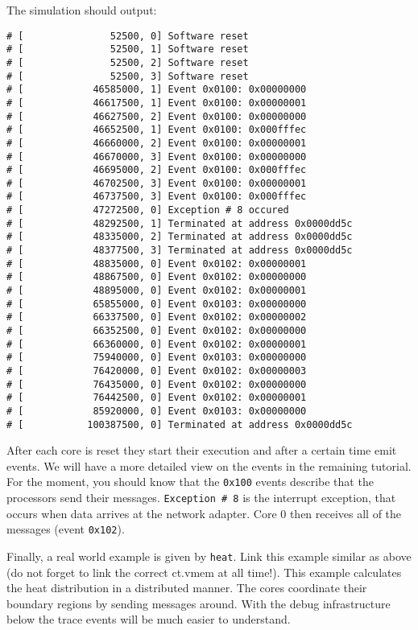 The simulation should output:

\begin{verbatim}
# [               52500, 0] Software reset
# [               52500, 1] Software reset
# [               52500, 2] Software reset
# [               52500, 3] Software reset
# [            46585000, 1] Event 0x0100: 0x00000000
# [            46617500, 1] Event 0x0100: 0x00000001
# [            46627500, 2] Event 0x0100: 0x00000000
# [            46652500, 1] Event 0x0100: 0x000fffec
# [            46660000, 2] Event 0x0100: 0x00000001
# [            46670000, 3] Event 0x0100: 0x00000000
# [            46695000, 2] Event 0x0100: 0x000fffec
# [            46702500, 3] Event 0x0100: 0x00000001
# [            46737500, 3] Event 0x0100: 0x000fffec
# [            47272500, 0] Exception # 8 occured
# [            48292500, 1] Terminated at address 0x0000dd5c
# [            48335000, 2] Terminated at address 0x0000dd5c
# [            48377500, 3] Terminated at address 0x0000dd5c
# [            48835000, 0] Event 0x0102: 0x00000001
# [            48867500, 0] Event 0x0102: 0x00000000
# [            48895000, 0] Event 0x0102: 0x00000001
# [            65855000, 0] Event 0x0103: 0x00000000
# [            66337500, 0] Event 0x0102: 0x00000002
# [            66352500, 0] Event 0x0102: 0x00000000
# [            66360000, 0] Event 0x0102: 0x00000001
# [            75940000, 0] Event 0x0103: 0x00000000
# [            76420000, 0] Event 0x0102: 0x00000003
# [            76435000, 0] Event 0x0102: 0x00000000
# [            76442500, 0] Event 0x0102: 0x00000001
# [            85920000, 0] Event 0x0103: 0x00000000
# [           100387500, 0] Terminated at address 0x0000dd5c
\end{verbatim}

After each core is reset they start their execution and after a
certain time emit events. We will have a more detailed view on the
events in the remaining tutorial. For the moment, you should know that
the \verb|0x100| events describe that the processors send their
messages. \verb|Exception # 8| is the interrupt exception, that occurs
when data arrives at the network adapter. Core 0 then receives all of
the messages (event \verb|0x102|).

Finally, a real world example is given by \verb|heat|. Link this
example similar as above (do not forget to link the correct ct.vmem at
all time!). This example calculates the heat distribution in a
distributed manner. The cores coordinate their boundary regions by
sending messages around. With the debug infrastructure below the trace
events will be much easier to understand.

